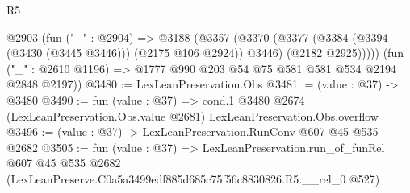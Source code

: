 \begin{lexlean}{R5}
\begin{coremodule}
      @2903
        (fun ("_" : @2904) =>
        @3188
          (@3357
            (@3370
              (@3377 (@3384 (@3394 (@3430 (@3445 @3446))) (@2175 @106 @2924)) @3446)
              (@2182 @2925)))))
      (fun ("_" : @2610 @1196) => @1777 @990 @203 @54 @75 @581 @581 @534 @2194 @2848 @2197))
@3480 := LexLeanPreservation.Obs
@3481 := (value : @37) -> @3480
@3490 := fun (value : @37) =>
  cond.{1} @3480 @2674 (LexLeanPreservation.Obs.value @2681) LexLeanPreservation.Obs.overflow
@3496 := (value : @37) -> LexLeanPreservation.RunConv @607 @45 @535 @2682
@3505 := fun (value : @37) =>
  LexLeanPreservation.run_of_funRel
    @607
    @45
    @535
    @2682
    (LexLeanPreserve.C0a5a3499edf885d685c75f56c8830826.R5.__rel_0 @527)
\end{coremodule}
\end{lexlean}
